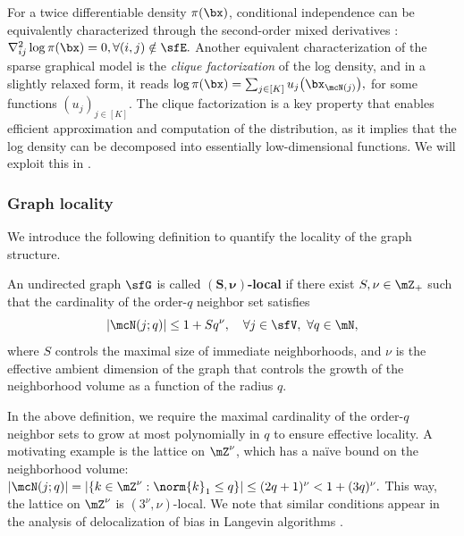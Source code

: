 \documentclass[11pt]{article}
\begin{document}
For a twice differentiable density $\pi(\bx)$, conditional independence can be equivalently characterized through the second-order mixed derivatives \cite{MR4111677}:
\(
    \nabla_{ij}^2 \log \pi(\bx) = 0, \forall (i,j) \notin \sfE.
\)
Another equivalent characterization of the sparse graphical model is the \emph{clique factorization} \cite{clifford1990markov} of the log density, and in a slightly relaxed form, it reads
\(
    \log \pi(\bx) = \sum_{j\in [K]} u_j\big(\bx_{\mcN(j)}\big),
\)
for some functions $(u_j)_{j\in [K]}$.
The clique factorization is a key property that enables efficient approximation and computation of the distribution, as it implies that the log density can be decomposed into essentially low-dimensional functions. We will exploit this in .

\subsubsection{Graph locality}

We introduce the following definition to quantify the locality of the graph structure.

\begin{defn}
\label{def:loc_graph}
An undirected graph $\sfG$ is called $\boldsymbol{(S,\nu)}$\textbf{-local} if there exist $S,\nu \in \mZ_+$ such that the cardinality of the order-$q$ neighbor set satisfies
\begin{equation}
\label{eqn:loc_graph}
    |\mcN(j;q)| \le 1 + S q^\nu , \quad \forall j \in \sfV, ~ \forall q\in\mN,
\end{equation}
where $S$ controls the maximal size of immediate neighborhoods, and $\nu$ is the effective ambient dimension of the graph that controls the growth of the neighborhood volume as a function of the radius $q$.
\end{defn}


In the above definition, we require the maximal cardinality of the order-$q$ neighbor sets to grow at most polynomially in $q$ to ensure effective locality. A motivating example is the lattice on $\mZ^\nu$, which has a na\"ive bound on the neighborhood volume:
\(
    |\mcN(j;q)| = | \{k\in \mZ^\nu: \norm{k}_1 \le q\} | \le (2q+1)^\nu < 1 + (3q)^\nu.
\)
This way, the lattice on $\mZ^\nu$ is $(3^\nu,\nu)$-local.
We note that similar conditions appear in the analysis of delocalization of bias in Langevin algorithms \cite{chen2026convergence,lacker2025hierarchical}.
\end{document}
